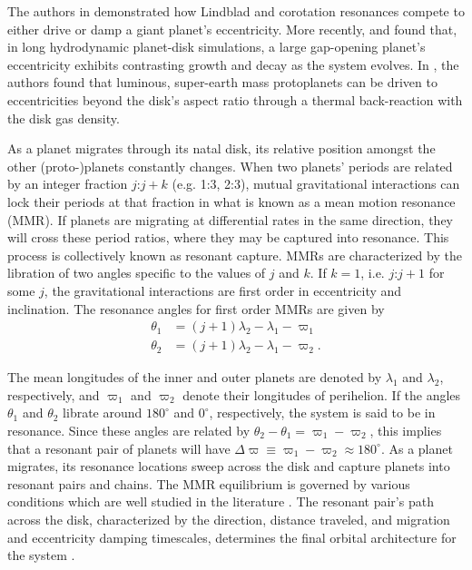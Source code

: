 \documentclass[usenatbib,onecolumn]{mnras}
\begin{document}
The authors in \cite{goldreich03_eccen_evolut_planet_gaseous_disks}
demonstrated how Lindblad and corotation resonances compete to either
drive or damp a giant planet's eccentricity.  More recently,
\citet{teyssandier17_secul_evolut_eccen_protop_discs} and
\citet{ragusa17_eccen_evolut_durin_planet_disc_inter} found that, in
long hydrodynamic planet-disk simulations, a large gap-opening
planet's eccentricity exhibits contrasting growth and decay as the
system evolves.  In
\citet{romero21_eccen_drivin_pebbl_accret_low_mass_planet}, the authors
found that luminous, super-earth mass protoplanets can be driven to
eccentricities beyond the disk's aspect ratio through a thermal
back-reaction with the disk gas density.

As a planet migrates through its natal disk, its relative position
amongst the other (proto-)planets constantly changes.  When two
planets' periods are related by an integer fraction \(j\):\(j+k\)
(e.g. 1:3, 2:3), mutual gravitational interactions can lock their
periods at that fraction in what is known as a mean motion resonance
(MMR).  If planets are migrating at differential rates in the same
direction, they will cross these period ratios, where they may be
captured into resonance.  This process is collectively known as
resonant capture.  MMRs are characterized by the libration of two
angles specific to the values of \(j\) and \(k\).  If \(k=1\),
i.e. \(j\):\(j+1\) for some \(j\), the gravitational interactions are first
order in eccentricity and inclination.  The resonance angles for first
order MMRs are given by
\begin{align}
\label{circangles1}
 \theta_1 &= (j+1)\lambda_2 - \lambda_1 - \varpi_1 \\
\label{circangles2}
 \theta_2 &= (j+1)\lambda_2 - \lambda_1 - \varpi_2.
\end{align}

\noindent The mean longitudes of the inner and outer planets
are denoted by \(\lambda_1\) and \(\lambda_2\), respectively, and
\(\varpi_1\) and \(\varpi_2\) denote their longitudes of perihelion.  If
the angles \(\theta_1\) and \(\theta_2\) librate around \(180^\circ\) and
\(0^\circ\), respectively, the system is said to be in resonance.  Since
these angles are related by \(\theta_2-\theta_1=\varpi_1-\varpi_2\),
this implies that a resonant pair of planets will have
\(\Delta\varpi\equiv \varpi_1-\varpi_2\approx 180^\circ\).  As a planet
migrates, its resonance locations sweep across the disk and capture
planets into resonant pairs and chains.  The MMR equilibrium is
governed by various conditions which are well studied in the
literature
\citep{henrard_second_1983,deck_migration_2015,goldreich_overstable_2014,xu_migration_2018}.
The resonant pair's path across the disk, characterized by the
direction, distance traveled, and migration and eccentricity damping
timescales, determines the final orbital architecture for the system
\citep{cresswell_evolution_2006,cresswell_three-dimensional_2008}.
\end{document}
